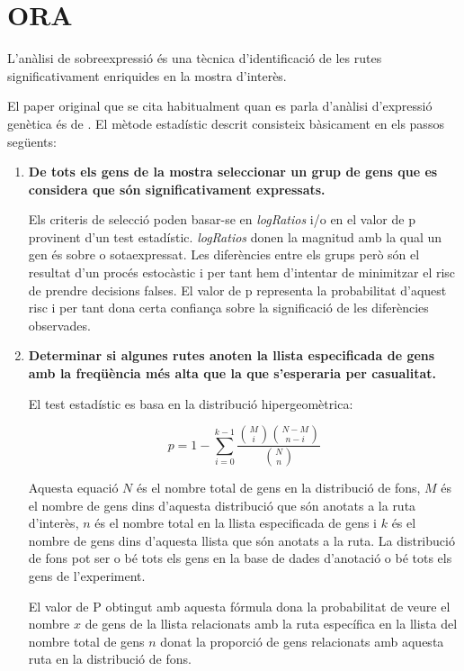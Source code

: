 \section{\gls{ORA}}

L'anàlisi de sobreexpressió és una tècnica d'identificació de les rutes significativament enriquides en la mostra d'interès. 

El paper original que se cita habitualment quan es parla d'anàlisi d'expressió genètica és de \cite{boyle2004go}. El mètode estadístic descrit consisteix bàsicament en els passos següents:

\begin{enumerate}
\item \textbf{De tots els gens de la mostra seleccionar un grup de gens que es considera que són significativament expressats.}

Els criteris de selecció poden basar-se en \textit{\gls{logRatio}s} i/o en el valor de p provinent d'un test estadístic. \textit{\gls{logRatio}s} donen la magnitud amb la qual un gen és sobre o sotaexpressat. Les diferències entre els grups però són el resultat d'un procés estocàstic i per tant hem d'intentar de minimitzar el risc de prendre decisions falses. El valor de p representa la probabilitat d'aquest risc i per tant dona certa confiança sobre la significació de les diferències observades.

\item \textbf{Determinar si algunes rutes anoten la llista especificada de gens amb la freqüència més alta que la que s’esperaria per casualitat.} 

El test estadístic es basa en la distribució hipergeomètrica: 

$$p = 1 - \displaystyle\sum_{i = 0}^{k-1}\frac{{M \choose i}{{N-M} \choose {n-i}}} {{N \choose n}}$$

Aquesta equació $N$ és el nombre total de gens en la distribució de fons, $M$ és el nombre de gens dins d'aquesta distribució que són anotats a la ruta d'interès, $n$ és el nombre total en la llista especificada de gens i $k$ és el nombre de gens dins d'aquesta llista que són anotats a la ruta. La distribució de fons pot ser o bé tots els gens en la base de dades d'anotació o bé tots els gens de l'experiment.

El valor de P obtingut amb aquesta fórmula dona la probabilitat de veure el nombre $x$ de gens de la llista relacionats amb la ruta específica en la llista del nombre total de gens $n$ donat la proporció de gens relacionats amb aquesta ruta en la distribució de fons.
\end{enumerate}

